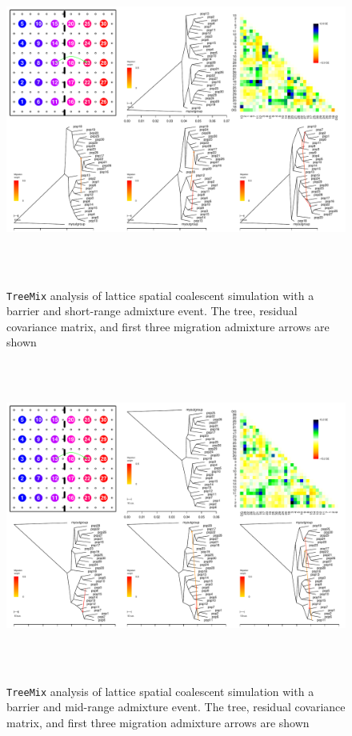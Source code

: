 \documentclass[10pt,letterpaper]{article}
\begin{document}
\begin{figure}
	\centering
		{\includegraphics[width=6in,height=4in]{../figs/sims/Treemix_comparison/ms_dataset_neighbor_admixturetreemix_fig_sequential.pdf}}
	\caption{\texttt{TreeMix} analysis of lattice spatial coalescent simulation with a barrier and short-range admixture event.  The tree, residual covariance matrix, and first three migration admixture arrows are shown}\label{sfig:treemix_neighboradmixture}
\end{figure}

\begin{figure}
	\centering
		{\includegraphics[width=6in,height=4in]{../figs/sims/Treemix_comparison/ms_dataset_barrier_and_inland_admixturetreemix_fig_sequential.pdf}}
	\caption{\texttt{TreeMix} analysis of lattice spatial coalescent simulation with a barrier and mid-range admixture event.  The tree, residual covariance matrix, and first three migration admixture arrows are shown}\label{sfig:treemix_inlandadmixture}
\end{figure}
\end{document}
